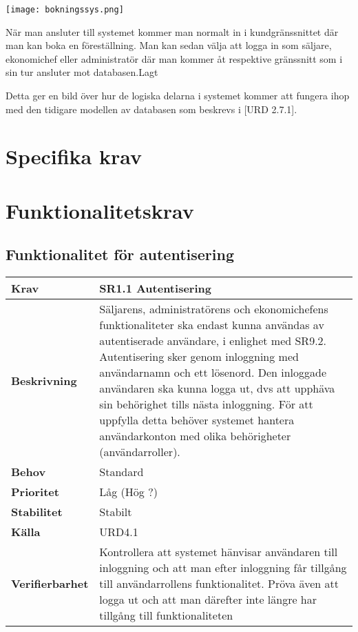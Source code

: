 \documentclass[a4paper, twoside, 11pt, titlepage]{article}
\begin{document}
	\texttt{[image: bokningssys.png]}

	När man ansluter till systemet kommer man normalt in i kundgränssnittet där man kan boka en föreställning. Man kan sedan välja att logga in som säljare, ekonomichef eller administratör där man kommer åt respektive gränssnitt som i sin tur ansluter mot databasen.Lagt 

	Detta ger en bild över hur de logiska delarna i systemet kommer att fungera ihop med den tidigare modellen av databasen som beskrevs i [URD 2.7.1].

\clearpage
\section{Specifika krav}



\clearpage
\section{Funktionalitetskrav}



	\subsection{Funktionalitet för autentisering}


	\begin{tabular} { p{2.6cm} p{12.5cm} }
		\hline
		\sffamily\textbf{Krav} & \sffamily\textbf{SR1.1 Autentisering } \\
		\hline
		\sffamily\textbf{Beskrivning} & Säljarens, administratörens och ekonomichefens funktionaliteter ska endast kunna användas av autentiserade användare, i enlighet med SR9.2. Autentisering sker genom inloggning med användarnamn och ett lösenord. Den inloggade användaren ska kunna logga ut, dvs att upphäva sin behörighet tills nästa inloggning. För att uppfylla detta behöver systemet hantera användarkonton med olika behörigheter (användarroller).  \\
		\hline
		\sffamily\textbf{Behov} & Standard  \\
		\hline
		\sffamily\textbf{Prioritet} & Låg (Hög ?)  \\
		\hline
		\sffamily\textbf{Stabilitet} & Stabilt  \\
		\hline
		\sffamily\textbf{Källa} & URD4.1  \\
		\hline
		\sffamily\textbf{Verifierbarhet} & Kontrollera att systemet hänvisar användaren till inloggning och att man efter inloggning får tillgång till användarrollens funktionalitet. Pröva även att logga ut och att man därefter inte längre har tillgång till funktionaliteten  \\
		\hline
	\end{tabular}
\end{document}
